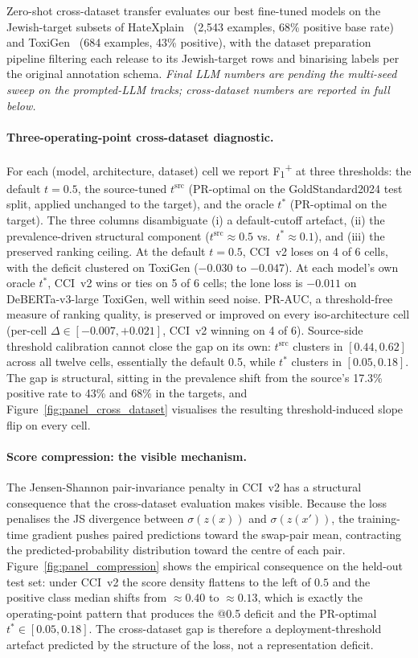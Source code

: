 \documentclass[10pt,a4paper]{article}
\begin{document}
Zero-shot cross-dataset transfer evaluates our best fine-tuned models on the Jewish-target subsets of HateXplain~\citep{mathew2021hatexplain} (2{,}543 examples, 68\% positive base rate) and ToxiGen~\citep{hartvigsen2022toxigen} (684 examples, 43\% positive), with the dataset preparation pipeline filtering each release to its Jewish-target rows and binarising labels per the original annotation schema. \emph{Final LLM numbers are pending the multi-seed sweep on the prompted-LLM tracks; cross-dataset numbers are reported in full below.}

\paragraph{Three-operating-point cross-dataset diagnostic.}
For each (model, architecture, dataset) cell we report F\textsubscript{1}\textsuperscript{+} at three thresholds: the default $t = 0.5$, the source-tuned $t^{\mathrm{src}}$ (PR-optimal on the GoldStandard2024 test split, applied unchanged to the target), and the oracle $t^* $ (PR-optimal on the target). The three columns disambiguate (i) a default-cutoff artefact, (ii) the prevalence-driven structural component ($t^{\mathrm{src}} \approx 0.5$ vs.\ $t^* \approx 0.1$), and (iii) the preserved ranking ceiling. At the default $t = 0.5$, CCI~v2 loses on 4 of 6 cells, with the deficit clustered on ToxiGen ($-0.030$ to $-0.047$). At each model's own oracle $t^*$, CCI~v2 wins or ties on 5 of 6 cells; the lone loss is $-0.011$ on DeBERTa-v3-large ToxiGen, well within seed noise. PR-AUC, a threshold-free measure of ranking quality, is preserved or improved on every iso-architecture cell (per-cell $\Delta \in [-0.007, +0.021]$, CCI~v2 winning on 4 of 6). Source-side threshold calibration cannot close the gap on its own: $t^{\mathrm{src}}$ clusters in $[0.44, 0.62]$ across all twelve cells, essentially the default 0.5, while $t^* $ clusters in $[0.05, 0.18]$. The gap is structural, sitting in the prevalence shift from the source's 17.3\% positive rate to 43\% and 68\% in the targets, and Figure~\ref{fig:panel_cross_dataset} visualises the resulting threshold-induced slope flip on every cell.

\paragraph{Score compression: the visible mechanism.}
The Jensen-Shannon pair-invariance penalty in CCI~v2 has a structural consequence that the cross-dataset evaluation makes visible. Because the loss penalises the JS divergence between $\sigma(z(x))$ and $\sigma(z(x'))$, the training-time gradient pushes paired predictions toward the swap-pair mean, contracting the predicted-probability distribution toward the centre of each pair. Figure~\ref{fig:panel_compression} shows the empirical consequence on the held-out test set: under CCI~v2 the score density flattens to the left of $0.5$ and the positive class median shifts from $\approx 0.40$ to $\approx 0.13$, which is exactly the operating-point pattern that produces the @0.5 deficit and the PR-optimal $t^* \in [0.05, 0.18]$. The cross-dataset gap is therefore a deployment-threshold artefact predicted by the structure of the loss, not a representation deficit.
\end{document}
